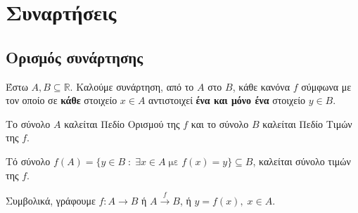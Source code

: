






\setcounter{chapter}{3}

\chapter{Συναρτήσεις}

\section{Ορισμός συνάρτησης}

\begin{dfn}
  Έστω $ A, B \subseteq \mathbb{R} $. Καλούμε \textcolor{Col1}{συνάρτηση}, από το $A$ 
  στο $B$, κάθε κανόνα $f$ σύμφωνα με τον οποίο σε \textbf{κάθε} στοιχείο $ x \in A $ 
  αντιστοιχεί \textbf{ένα και μόνο ένα} στοιχείο $ y \in B $. 
  \begin{myitemize}
    \item Το σύνολο $A$ καλείται \textcolor{Col1}{Πεδίο Ορισμού} της $f$ και το σύνολο 
      $B$ καλείται \textcolor{Col1}{Πεδίο Τιμών} της $f$.
    \item Τό σύνολο $ f(A) = \{ y \in B \; : \; \exists x \in A \; \text{με} 
      \; f(x)=y \} \subseteq B $, καλείται \textcolor{Col1}{σύνολο τιμών} της $f$.
  \end{myitemize}

  Συμβολικά, γράφουμε $ f \colon A \to B $ ή $ A \xrightarrow{f} B $, 
  ή $ y=f(x), \; x \in A $.  
\end{dfn}


